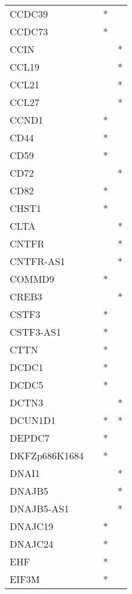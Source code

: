 \begin{longtable}{lccc}
CCDC39        &       &  * &         \\
CCDC73        &       &  * &         \\
CCIN          &       &    &       * \\
CCL19         &       &    &       * \\
CCL21         &       &    &       * \\
CCL27         &       &    &       * \\
CCND1         &       &  * &         \\
CD44          &       &  * &         \\
CD59          &       &  * &         \\
CD72          &       &    &       * \\
CD82          &       &  * &         \\
CHST1         &       &  * &         \\
CLTA          &       &    &       * \\
CNTFR         &       &    &       * \\
CNTFR-AS1     &       &    &       * \\
COMMD9        &       &  * &         \\
CREB3         &       &    &       * \\
CSTF3         &       &  * &         \\
CSTF3-AS1     &       &  * &         \\
CTTN          &       &  * &         \\
DCDC1         &       &  * &         \\
DCDC5         &       &  * &         \\
DCTN3         &       &    &       * \\
DCUN1D1       &       &  * &       * \\
DEPDC7        &       &  * &         \\
DKFZp686K1684 &       &  * &         \\
DNAI1         &       &    &       * \\
DNAJB5        &       &    &       * \\
DNAJB5-AS1    &       &    &       * \\
DNAJC19       &       &  * &         \\
DNAJC24       &       &  * &         \\
EHF           &       &  * &         \\
EIF3M         &       &  * &         \\

\end{longtable}
